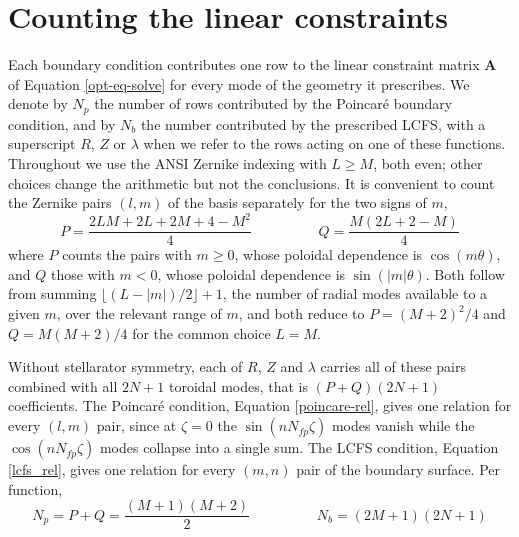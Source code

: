 \documentclass{jpp}
\begin{document}
\section{Counting the linear constraints}\label{app:counting}
Each boundary condition contributes one row to the linear constraint matrix $\mathbf{A}$ of Equation \ref{opt-eq-solve} for every mode of the geometry it prescribes. We denote by $N_p$ the number of rows contributed by the Poincaré boundary condition, and by $N_b$ the number contributed by the prescribed LCFS, with a superscript $R$, $Z$ or $\lambda$ when we refer to the rows acting on one of these functions. Throughout we use the ANSI Zernike indexing with $L\geq M$, both even; other choices change the arithmetic but not the conclusions. It is convenient to count the Zernike pairs $(l,m)$ of the basis separately for the two signs of $m$,
\begin{equation}
    P = \frac{2LM + 2L + 2M + 4 - M^2}{4} \hspace{2cm} Q = \frac{M(2L + 2 - M)}{4} \label{PQ-counts}
\end{equation}
where $P$ counts the pairs with $m\geq0$, whose poloidal dependence is $\cos(m\theta)$, and $Q$ those with $m<0$, whose poloidal dependence is $\sin(|m|\theta)$. Both follow from summing $\lfloor (L-|m|)/2 \rfloor + 1$, the number of radial modes available to a given $m$, over the relevant range of $m$, and both reduce to $P=(M+2)^2/4$ and $Q=M(M+2)/4$ for the common choice $L=M$.

Without stellarator symmetry, each of $R$, $Z$ and $\lambda$ carries all of these pairs combined with all $2N+1$ toroidal modes, that is $(P+Q)(2N+1)$ coefficients. The Poincaré condition, Equation \ref{poincare-rel}, gives one relation for every $(l,m)$ pair, since at $\zeta=0$ the $\sin(nN_{fp}\zeta)$ modes vanish while the $\cos(nN_{fp}\zeta)$ modes collapse into a single sum. The LCFS condition, Equation \ref{lcfs_rel}, gives one relation for every $(m,n)$ pair of the boundary surface. Per function,
\begin{equation}
    N_p = P + Q = \frac{(M+1)(M+2)}{2} \hspace{2cm} N_b = (2M+1)(2N+1)
\end{equation}
\end{document}
